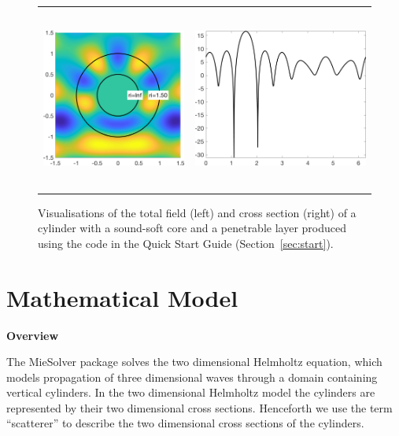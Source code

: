 \documentclass[11pt,letterpaper]{article}
\newcommand{\techheading}[1]{%
    \par\vspace{-0.3\parskip}\noindent\hspace{-1cm}\textbf{#1}%
    \par\vspace{-0.5\parskip}\noindent\nopagebreak\ignorespaces}
\begin{document}
\begin{figure}
  \centering
  \begin{tabular}{cc}
    \includegraphics[height=6cm]{quick_start_total_field}
    &
    \includegraphics[height=6cm]{quick_start_far_field}
  \end{tabular}
  \caption{\label{fig:quick-start}
    Visualisations of the total field (left) and cross section (right)
    of a cylinder with a sound-soft core and a penetrable layer
    produced using the code in 
    the Quick Start Guide (Section~\ref{sec:start}).}
\end{figure}

\section{Mathematical Model}
\label{sec:model}

\techheading{Overview}
The MieSolver package solves the two dimensional Helmholtz equation,
which models propagation of three dimensional waves through a domain
containing vertical cylinders.
In the two dimensional Helmholtz model the cylinders are represented by
their two dimensional cross sections.
Henceforth we use the term ``scatterer'' to describe the two dimensional
cross sections of the cylinders.
\end{document}
